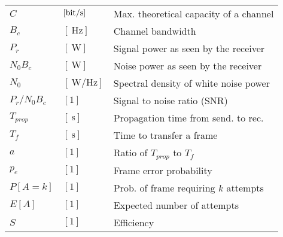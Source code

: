 \documentclass{form}
\begin{document}
\begin{center}
    \noindent%
    \begin{minipage}{0.49\textwidth}
        \begin{tabular}{@{}l l | p{59mm}@{}}
            $C$           & $[\SI{}{\bit/\second}     ]$ & Max. theoretical capacity of a channel                      \\
            $B_c$         & $[\SI{}{\hertz}           ]$ & Channel bandwidth                                           \\
            $P_r$         & $[\SI{}{\watt}            ]$ & Signal power as seen by the receiver                        \\
            $N_0 B_c$     & $[\SI{}{\watt}            ]$ & Noise power as seen by the receiver                         \\
            $N_0$         & $[\SI{}{\watt/\hertz}     ]$ & Spectral density of white noise power                       \\
            $P_r/N_0 B_c$ & $[1                       ]$ & Signal to noise ratio (SNR)                                 \\
            $T_{prop}$    & $[\SI{}{\second}          ]$ & Propagation time from send. to rec.                         \\
            $T_f$         & $[\SI{}{\second}          ]$ & Time to transfer a frame                                    \\
            $a$           & $[1                       ]$ & Ratio of $T_{prop}$ to $T_f$                                \\
            $p_e$         & $[1                       ]$ & Frame error probability                                     \\
            $P[A=k]$      & $[1                       ]$ & Prob. of frame requiring $k$ attempts                       \\
            $E[A]$        & $[1                       ]$ & Expected number of attempts                                 \\
            $S$           & $[1                       ]$ & Efficiency                                                  \\
        \end{tabular}
    \end{minipage}
    \begin{minipage}{0.49\textwidth}
        \begin{tabular}{l l | p{59mm}}

\end{tabular}
\end{minipage}
\end{center}
\end{document}
